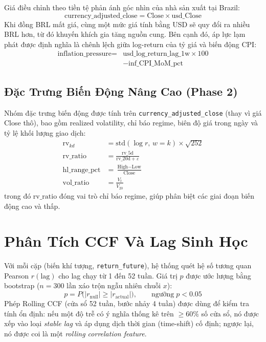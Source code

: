 \documentclass[conference]{IEEEtran}
\begin{document}
Giá điều chỉnh theo tiền tệ phản ánh góc nhìn của nhà sản xuất tại Brazil:
\begin{equation}
\text{currency\_adjusted\_close} = \text{Close} \times \text{usd\_Close}
\label{eq:cac}
\end{equation}
Khi đồng BRL mất giá, cùng một mức giá tính bằng USD sẽ quy đổi ra nhiều BRL
hơn, từ đó khuyến khích gia tăng nguồn cung. Bên cạnh đó, áp lực lạm phát
được định nghĩa là chênh lệch giữa log-return của tỷ giá và biến động CPI:
\begin{equation}
\begin{aligned}
\text{inflation\_pressure} = {}
  &\text{usd\_log\_return\_lag\_1w} \times 100 \\
  &{}- \text{inf\_CPI\_MoM\_pct}
\end{aligned}
\label{eq:infpress}
\end{equation}

\subsection{Đặc Trưng Biến Động Nâng Cao (Phase 2)}

Nhóm đặc trưng biến động được tính trên \texttt{currency\_adjusted\_close}
(thay vì giá Close thô), bao gồm realized volatility, chỉ báo regime, biên độ
giá trong ngày và tỷ lệ khối lượng giao dịch:
\begin{align}
\text{rv}_{kd} &= \text{std}(\log r,\, w{=}k) \times \sqrt{252}
  \label{eq:rv} \\
\text{rv\_ratio} &= \frac{\text{rv\_5d}}{\text{rv\_20d} + \varepsilon}
  \label{eq:rvratio} \\
\text{hl\_range\_pct} &= \frac{\text{High}-\text{Low}}{\text{Close}}
  \label{eq:hlrange} \\
\text{vol\_ratio} &= \frac{V_t}{\overline{V}_{20}}
  \label{eq:volratio}
\end{align}
trong đó $\text{rv\_ratio}$ đóng vai trò chỉ báo regime, giúp phân biệt các
giai đoạn biến động cao và thấp.

\section{Phân Tích CCF Và Lag Sinh Học}
\label{sec:ccf}

Với mỗi cặp (biến khí tượng, \texttt{return\_future}), hệ thống quét hệ số
tương quan Pearson $r(\text{lag})$ cho lag chạy từ 1 đến 52 tuần. Giá trị $p$
được ước lượng bằng bootstrap ($n=300$ lần xáo trộn ngẫu nhiên chuỗi $x$):
\begin{equation}
p = P\bigl(|r_\text{null}| \geq |r_\text{actual}|\bigr), \qquad
\text{ngưỡng}\; p < 0.05
\label{eq:bootstrap_p}
\end{equation}
Phép Rolling CCF (cửa sổ 52 tuần, bước nhảy 4 tuần) được dùng để kiểm tra
tính ổn định: nếu một độ trễ có ý nghĩa thống kê trên $\geq 60\%$ số cửa sổ,
nó được xếp vào loại \emph{stable lag} và áp dụng dịch thời gian (time-shift)
cố định; ngược lại, nó được coi là một \emph{rolling correlation feature}.
\end{document}
